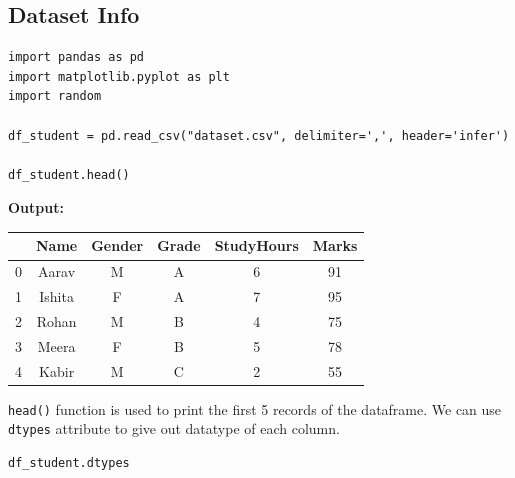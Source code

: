 %  


\subsection{Dataset Info}



\begin{lstlisting}[style=python]
import pandas as pd
import matplotlib.pyplot as plt
import random

df_student = pd.read_csv("dataset.csv", delimiter=',', header='infer')

df_student.head()
\end{lstlisting}

\textbf{Output:}

\begin{tabular}{cccccc}
    \toprule
    & \textbf{Name} & \textbf{Gender} & \textbf{Grade} & \textbf{StudyHours} & \textbf{Marks} \\
    \midrule
    0 & Aarav  & M & A & 6 & 91 \\
    1 & Ishita & F & A & 7 & 95 \\
    2 & Rohan  & M & B & 4 & 75 \\
    3 & Meera  & F & B & 5 & 78 \\
    4 & Kabir  & M & C & 2 & 55 \\
    \bottomrule
\end{tabular}
\newline
\gap

\texttt{head()} function is used to print the first 5 records of the dataframe.
We can use \texttt{dtypes} attribute to give out datatype of each column.

\begin{lstlisting}[style=python]
df_student.dtypes
\end{lstlisting}

